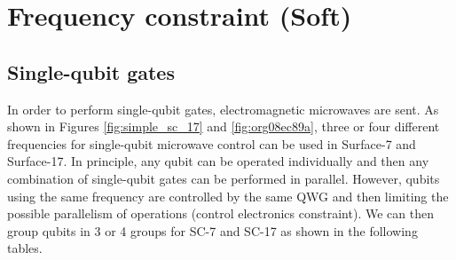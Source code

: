 \documentclass[11pt]{article}
\begin{document}













\section{Frequency constraint (Soft)}
\label{sec:orgff4c391}

\subsection{Single-qubit gates}

In order to perform single-qubit gates, electromagnetic microwaves are sent. As shown in Figures \ref{fig:simple_sc_17} and \ref{fig:org08ec89a}, three or four different frequencies for single-qubit microwave control can be used in Surface-7 and Surface-17. In principle, any qubit can be operated individually and then any combination of single-qubit gates can be performed in parallel. However, qubits using the same frequency are controlled by the same QWG and then limiting the possible parallelism of operations (control electronics constraint). We can then group qubits in 3 or 4 groups for SC-7 and SC-17 as shown in the following tables.
\end{document}
